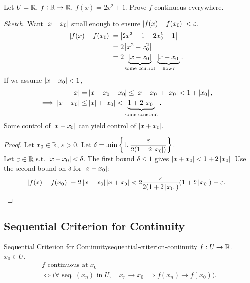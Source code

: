 \begin{example}
  Let $U=\mathbb{R}$, $f:\mathbb{R}\to\mathbb{R}$, $f(x)=2x^2+1$. Prove $f$ continuous everywhere.

  \textit{Sketch.} Want $\left\lvert x-x_0 \right\rvert$ small enough to ensure $\left\lvert f(x)-f(x_0) \right\rvert<\varepsilon$.
  \[
    \begin{aligned}
      \left\lvert f(x)-f(x_0) \right\rvert
       & =\left\lvert 2x^2+1-2x_0^2-1 \right\rvert                             \\
       & =2\left\lvert x^2-x_0^2 \right\rvert                                  \\
       & =2\underbrace{\left\lvert x-x_0 \right\rvert}_{\text{some control}}\,
      \underbrace{\left\lvert x+x_0 \right\rvert}_{\text{how?}}.
    \end{aligned}
  \]
  If we assume $\left\lvert x-x_0 \right\rvert<1$,
  \[
    \begin{aligned}
      \left\lvert x \right\rvert             & =\left\lvert x-x_0+x_0 \right\rvert\le\left\lvert x-x_0 \right\rvert+\left\lvert x_0 \right\rvert<1+\left\lvert x_0 \right\rvert,                  \\
      \implies\left\lvert x+x_0 \right\rvert & \le\left\lvert x \right\rvert+\left\lvert x_0 \right\rvert<\underbrace{1+2\left\lvert x_0 \right\rvert}_{\text{some constant}}.
    \end{aligned}
  \]
  Some control of $\left\lvert x-x_0 \right\rvert$ can yield control of $\left\lvert x+x_0 \right\rvert$.

  \begin{proof}
    Let $x_0\in\mathbb{R}$, $\varepsilon>0$. Let
    $\displaystyle\delta=\min\left\{1,\frac{\varepsilon}{2(1+2\left\lvert x_0 \right\rvert)}\right\}$.\\
    Let $x\in\mathbb{R}$ s.t. $\left\lvert x-x_0 \right\rvert<\delta$.
    The first bound $\delta\le1$ gives $\left\lvert x+x_0 \right\rvert<1+2\left\lvert x_0 \right\rvert$.
    Use the second bound on $\delta$ for $\left\lvert x-x_0 \right\rvert$:
    \[
      \left\lvert f(x)-f(x_0) \right\rvert=2\left\lvert x-x_0 \right\rvert\left\lvert x+x_0 \right\rvert
      <2\frac{\varepsilon}{2(1+2\left\lvert x_0 \right\rvert)}(1+2\left\lvert x_0 \right\rvert)=\varepsilon. \qedhere
    \]
  \end{proof}
\end{example}

\subsection{Sequential Criterion for Continuity}

\begin{theorem}{Sequential Criterion for Continuity}{sequential-criterion-continuity}
  $f:U\to\mathbb{R}$, $x_0\in U$.
  \[
    \begin{aligned}
       & f\text{ continuous at }x_0                            \\
       & \iff\bigl(\forall\text{ seq. }(x_n)\text{ in }U,\quad
      x_n\to x_0\implies f(x_n)\to f(x_0)\bigr).
    \end{aligned}
  \]
\end{theorem}

